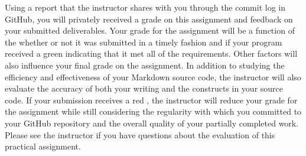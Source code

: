 \documentclass[11pt]{article}
\newcommand{\naughtmark}{\ding{55}}
\begin{document}
Using a report that the instructor shares with you through the commit log in GitHub, you will privately received a grade
on this assignment and feedback on your submitted deliverables. Your grade for the assignment will be a function of the
whether or not it was submitted in a timely fashion and if your program received a green \checkmark{} indicating that it
met all of the requirements. Other factors will also influence your final grade on the assignment. In addition to
studying the efficiency and effectiveness of your Markdown source code, the instructor will also evaluate the accuracy of
both your writing and the constructs in your source code. If your submission receives a red \naughtmark{}, the
instructor will reduce your grade for the assignment while still considering the regularity with which you committed to
your GitHub repository and the overall quality of your partially completed work. Please see the instructor if you have
questions about the evaluation of this practical assignment.


\end{document}
